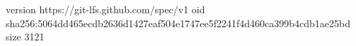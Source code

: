 version https://git-lfs.github.com/spec/v1
oid sha256:5064dd465ecdb2636d1427eaf504e1747ee5f2241f4d460ca399b4cdb1ae25bd
size 3121
